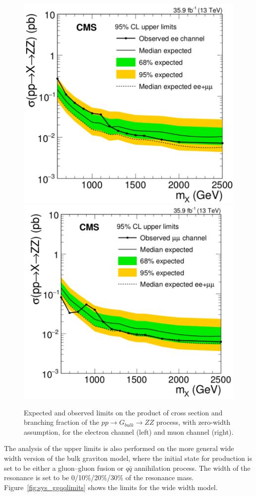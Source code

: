\begin{figure}[htbp]
\begin{center}
\includegraphics[width=0.49\linewidth]{figures/sys_narrowlimitsel.png}
\includegraphics[width=0.49\linewidth]{figures/sys_narrowlimitsmu.png}
\caption{Expected and observed limits on the product of cross section and branching fraction of the $pp\rightarrow G_{bulk}\rightarrow ZZ$ process, with zero-width assumption, for the electron channel (left) and muon channel (right).}
\label{fig:sys_narrowlimitselmu}
\end{center}
\end{figure}

\vspace{0.3cm}
The analysis of the upper limits is also performed on the more general wide width version of the bulk graviton model, where the initial state for production is set to be either a gluon–gluon fusion or $q\bar{q}$ annihilation process. The width of the resonance is set to be 0/10\%/20\%/30\% of the resonance mass. Figure~\ref{fig:sys_ggqqlimits} shows the limits for the wide width model.

